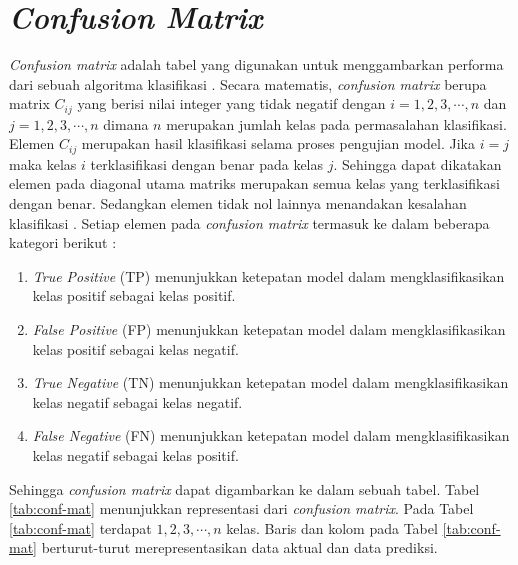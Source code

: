 \section{\textit{Confusion Matrix}}
\textit{Confusion matrix} adalah tabel yang digunakan untuk menggambarkan performa dari sebuah algoritma klasifikasi \citep{nasution2022sentiment, julianto2021performance}. Secara matematis, \textit{confusion matrix} berupa matrix $C_{ij}$ yang berisi nilai integer yang tidak negatif dengan $i=1, 2, 3, \cdots, n$ dan $j=1, 2, 3, \cdots, n$ dimana $n$ merupakan jumlah kelas pada permasalahan klasifikasi. Elemen $C_{ij}$ merupakan hasil klasifikasi selama proses pengujian model. Jika $i=j$ maka kelas $i$ terklasifikasi dengan benar pada kelas $j$. Sehingga dapat dikatakan elemen pada diagonal utama matriks merupakan semua kelas yang terklasifikasi dengan benar. Sedangkan elemen tidak nol lainnya menandakan kesalahan klasifikasi \citep{Susmaga2004}. Setiap elemen pada \textit{confusion matrix} termasuk ke dalam beberapa kategori berikut \citep{Shultz2017}:
\begin{enumerate}
    \item \textit{True Positive} (TP) menunjukkan ketepatan model dalam mengklasifikasikan kelas positif sebagai kelas positif.
    \item \textit{False Positive} (FP) menunjukkan ketepatan model dalam mengklasifikasikan kelas positif sebagai kelas negatif.
    \item \textit{True Negative} (TN) menunjukkan ketepatan model dalam mengklasifikasikan kelas negatif sebagai kelas negatif.
    \item \textit{False Negative} (FN) menunjukkan ketepatan model dalam mengklasifikasikan kelas negatif sebagai kelas positif.
\end{enumerate}

Sehingga \textit{confusion matrix} dapat digambarkan ke dalam sebuah tabel. Tabel \ref{tab:conf-mat} menunjukkan representasi dari \textit{confusion matrix}. Pada Tabel \ref{tab:conf-mat} terdapat $1, 2, 3, \cdots, n$ kelas. Baris dan kolom pada Tabel \ref{tab:conf-mat} berturut-turut merepresentasikan data aktual dan data prediksi.


